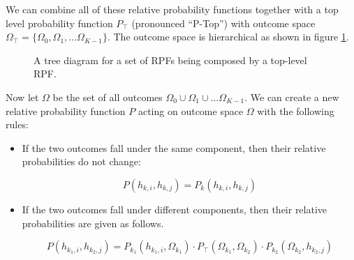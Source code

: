 \documentclass[twoside]{article}
\theoremstyle{plain}%
\theoremstyle{definition}
\theoremstyle{remark}
\begin{document}
We can combine all of these relative probability functions together with a top level probability function \(P_\top\) (pronounced ``P-Top'') with outcome space \(\Omega_\top = \{\Omega_0, \Omega_1, ... \Omega_{K- 1}\}\). The outcome space is hierarchical as shown in figure \ref{fig:compose_rpfs}.

\begin{figure}[h]
\caption{A tree diagram for a set of RPFs being composed by a top-level RPF.}
\label{fig:compose_rpfs}
\end{figure}

Now let \(\Omega\) be the set of all outcomes \(\Omega_0 \cup \Omega_1 \cup \dots \Omega_{K-1}\). We can create a new relative probability function \(P\) acting on outcome space \(\Omega\) with the following rules:

\begin{itemize}
\item If the two outcomes fall under the same component, then their relative probabilities do not change:

\begin{equation}
\label{rpf_composition_same_branch}
P(h_{k, i}, h_{k, j}) = P_k(h_{k, i}, h_{k, j})
\end{equation}

\item If the two outcomes fall under different components, then their relative probabilities are given as follows.

\begin{equation}
\label{eq:rpf_composition_different_branch}
P(h_{k_1, i}, h_{k_2, j}) = P_{k_1}(h_{k_1, i}, \Omega_{k_1}) \cdot  P_{\top}(\Omega_{k_1}, \Omega_{k_2}) \cdot P_{k_2}(\Omega_{k_2}, h_{k_2, j})
\end{equation}
\end{itemize}
\end{document}
